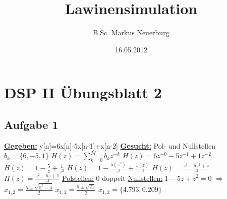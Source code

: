 \documentclass[12pt]{scrreprt}
\title{Lawinensimulation}
\author{B.Sc. Markus Neuerburg}
\date{16.05.2012}
\begin{document}
\setlength{\topmargin}{0cm}
\parindent 0pt
\section*{DSP II Übungsblatt 2}
\subsection*{Aufgabe 1}
\underline{\textbf{Gegeben:}}\newline
\hspace*{5mm}y[n]=6x[n]-5x[n-1]+x[n-2]\newline
\newline
\underline{\textbf{Gesucht:}}\newline
\hspace*{5mm}Pol- und Nullstellen\newline
\newline
\hspace*{5mm}$b_k=\{6,-5,1\}$\newline
\hspace*{5mm}$H(z)=\sum_{k=0}^{M}{b_k z^{-k}}$\newline
\hspace*{5mm}$H(z)=6z^{-0}-5z^{-1}+1z^{-2}$\newline
\hspace*{5mm}$H(z)=1-\frac{5}{z}+\frac{1}{z^2}$\newline
\hspace*{5mm}$H(z)=1-\frac{5(z^2)}{z^3}+\frac{1(z)}{z^3}$\newline
\hspace*{5mm}$H(z)=\frac{z^3-5z^2+z}{z^3}$\newline
\hspace*{5mm}$H(z)=\frac{z^2-5z+1}{z^2}$\newline
\hspace*{5mm}\underline{Polstellen:}\newline
\hspace*{5mm}0 doppelt\newline
\hspace*{5mm}\underline{Nullstellen:}\newline
\hspace*{5mm}$1-5z+z^2=0$\newline
\hspace*{5mm}$\Rightarrow$ $x_{1,2}=\frac{5 \pm \sqrt{5^2 - 4}}{2}$\newline
\hspace*{5mm}$x_{1,2}=\frac{5 \pm \sqrt{21}}{2}$\newline
\hspace*{5mm}$x_{1,2}=\{4.793, 0.209\}$
\end{document}
